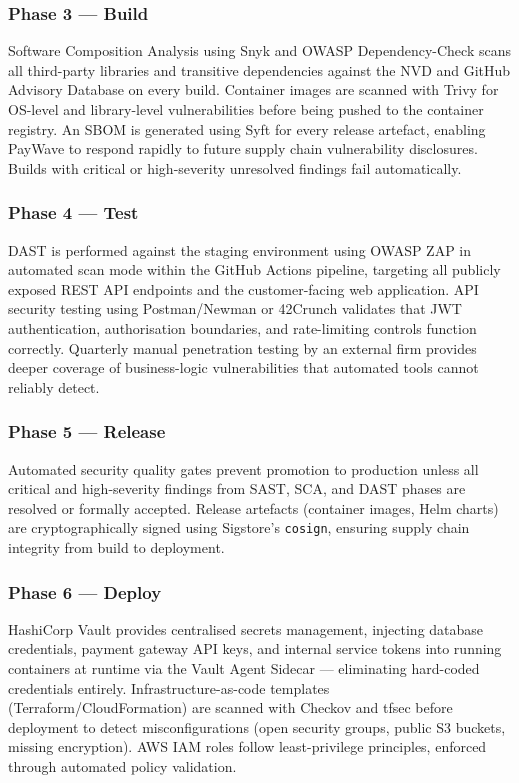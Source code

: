 \documentclass[12pt,a4paper]{article}
\begin{document}
\subsubsection*{Phase 3 — Build}

Software Composition Analysis using Snyk and OWASP Dependency-Check scans all third-party
libraries and transitive dependencies against the NVD and GitHub Advisory Database on every
build. Container images are scanned with Trivy \citep{trivy2023} for OS-level and
library-level vulnerabilities before being pushed to the container registry. An SBOM is
generated using Syft for every release artefact, enabling PayWave to respond rapidly to
future supply chain vulnerability disclosures. Builds with critical or high-severity
unresolved findings fail automatically.

\subsubsection*{Phase 4 — Test}

DAST is performed against the staging environment using OWASP ZAP in automated scan mode
within the GitHub Actions pipeline, targeting all publicly exposed REST API endpoints and
the customer-facing web application. API security testing using Postman/Newman or 42Crunch
validates that JWT authentication, authorisation boundaries, and rate-limiting controls
function correctly. Quarterly manual penetration testing by an external firm provides
deeper coverage of business-logic vulnerabilities that automated tools cannot reliably
detect.

\subsubsection*{Phase 5 — Release}

Automated security quality gates prevent promotion to production unless all critical and
high-severity findings from SAST, SCA, and DAST phases are resolved or formally accepted.
Release artefacts (container images, Helm charts) are cryptographically signed using
Sigstore's \texttt{cosign}, ensuring supply chain integrity from build to deployment.

\subsubsection*{Phase 6 — Deploy}

HashiCorp Vault \citep{hashicorpvault} provides centralised secrets management, injecting
database credentials, payment gateway API keys, and internal service tokens into running
containers at runtime via the Vault Agent Sidecar --- eliminating hard-coded credentials
entirely. Infrastructure-as-code templates (Terraform/CloudFormation) are scanned with
Checkov and tfsec before deployment to detect misconfigurations (open security groups,
public S3 buckets, missing encryption). AWS IAM roles follow least-privilege principles,
enforced through automated policy validation.
\end{document}
